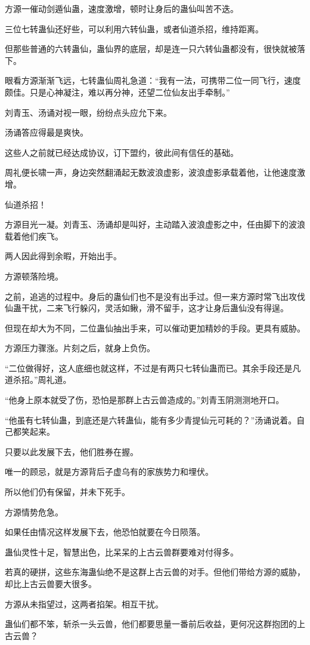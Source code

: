 \begin{this_body}
方源一催动剑遁仙蛊，速度激增，顿时让身后的蛊仙叫苦不迭。

三位七转蛊仙还好些，可以利用六转仙蛊，或者仙道杀招，维持距离。

但那些普通的六转蛊仙，蛊仙界的底层，却是连一只六转仙蛊都没有，很快就被落下。

眼看方源渐渐飞远，七转蛊仙周礼急道：“我有一法，可携带二位一同飞行，速度颇佳。只是心神凝注，难以再分神，还望二位仙友出手牵制。”

刘青玉、汤诵对视一眼，纷纷点头应允下来。

汤诵答应得最是爽快。

这些人之前就已经达成协议，订下盟约，彼此间有信任的基础。

周礼便长啸一声，身边突然翻涌起无数波浪虚影，波浪虚影承载着他，让他速度激增。

仙道杀招！

方源目光一凝。刘青玉、汤诵却是叫好，主动踏入波浪虚影之中，任由脚下的波浪载着他们疾飞。

两人因此得到余暇，开始出手。

方源顿落险境。

之前，追逃的过程中。身后的蛊仙们也不是没有出手过。但一来方源时常飞出攻伐仙蛊干扰，二来飞行躲闪，灵活如鳅，滑不留手，这才让身后蛊仙没有得逞。

但现在却大为不同，二位蛊仙抽出手来，可以催动更加精妙的手段。更具有威胁。

方源压力骤涨。片刻之后，就身上负伤。

“二位做得好，这人底细也就这样，不过是有两只七转仙蛊而已。其余手段还是凡道杀招。”周礼道。

“他身上原本就受了伤，恐怕是那群上古云兽造成的。”刘青玉阴测测地开口。

“他虽有七转仙蛊，到底还是六转蛊仙，能有多少青提仙元可耗的？”汤诵说着。自己都笑起来。

只要以此发展下去，他们胜券在握。

唯一的顾忌，就是方源背后子虚乌有的家族势力和埋伏。

所以他们仍有保留，并未下死手。

方源情势危急。

如果任由情况这样发展下去，他恐怕就要在今日陨落。

蛊仙灵性十足，智慧出色，比呆呆的上古云兽群要难对付得多。

若真的硬拼，这些东海蛊仙绝不是这群上古云兽的对手。但他们带给方源的威胁，却比上古云兽要大很多。

方源从未指望过，这两者掐架。相互干扰。

蛊仙们都不笨，斩杀一头云兽，他们都要思量一番前后收益，更何况这群抱团的上古云兽？


\end{this_body}
